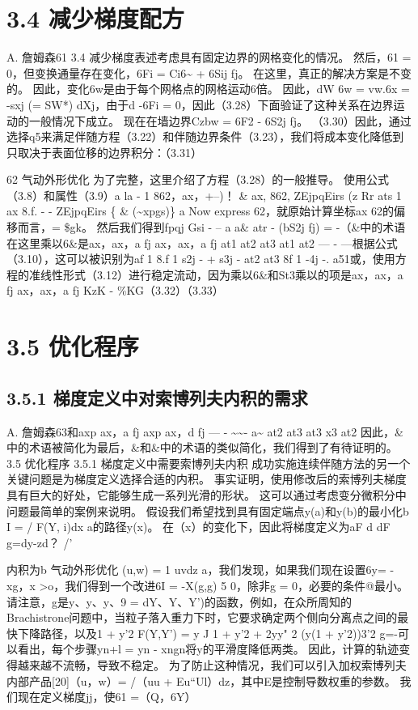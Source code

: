 \documentclass[UTF8,11pt,a4paper,openany,fontset=fandol]{ctexbook}
\begin{document}
\section{3.4 减少梯度配方}
A. 詹姆森61 3.4 减少梯度表述考虑具有固定边界的网格变化的情况。 然后，61 = 0，但变换通量存在变化，6Fi = Ci6\textasciitilde{} + 6Sij fj。 在这里，真正的解决方案是不变的。 因此，变化6w是由于每个网格点的网格运动6倍。 因此，dW 6w = vw.6x = -sxj (= SW*) dXj，由于d -6Fi = 0，因此（3.28）下面验证了这种关系在边界运动的一般情况下成立。 现在在墙边界Czbw = 6F2 - 6S2j fj。 （3.30）因此，通过选择q5来满足伴随方程（3.22）和伴随边界条件（3.23），我们将成本变化降低到只取决于表面位移的边界积分：（3.31）

62 气动外形优化 为了完整，这里介绍了方程（3.28）的一般推导。 使用公式（3.8）和属性（3.9）a la - 1 862，ax，+--)！ \& ax, 862, ZEjpqEirs (z Rr ats 1 ax 8.f. - - ZEjpqEirs \{ \& (\textasciitilde{}xpgs)\} a Now express 62，就原始计算坐标ax 62的偏移而言，= \$gk。 然后我们得到fpqj Gsi - -- a a\& atr - (bS2j fj) = -（\&中的术语在这里乘以6\&是ax，ax，a fj ax，ax，a fj at1 at2 at3 at1 at2 --- - ---根据公式（3.10），这可以被识别为af 1 8.f 1 s2j - + s3j - at2 at3 8f 1 -4j -. a51或，使用方程的准线性形式（3.12）进行稳定流动，因为乘以6\&和St3乘以的项是ax，ax，a fj ax，ax，a fj KzK - \%KG（3.32）（3.33）

\section{3.5 优化程序}
\subsection{3.5.1 梯度定义中对索博列夫内积的需求}
A. 詹姆森63和axp ax，a fj axp ax，d fj --- - \textasciitilde{}\textasciitilde{}- a\textasciitilde{} at2 at3 at3 x3 at2 因此，\&中的术语被简化为最后，\&和\&中的术语的类似简化，我们得到了有待证明的。 3.5 优化程序 3.5.1 梯度定义中需要索博列夫内积 成功实施连续伴随方法的另一个关键问题是为梯度定义选择合适的内积。 事实证明，使用修改后的索博列夫梯度具有巨大的好处，它能够生成一系列光滑的形状。 这可以通过考虑变分微积分中问题最简单的案例来说明。 假设我们希望找到具有固定端点y(a)和y(b)的最小化b I = / F(Y, i)dx a的路径y(x)。 在（x）的变化下，因此将梯度定义为aF d dF g=dy-zd？ /'

内积为b 气动外形优化 (u,w) = 1 uvdz a，我们发现，如果我们现在设置6y= -xg，x >o，我们得到一个改进6I = -X(g,g) 5 0，除非g = 0，必要的条件@最小。 请注意，g是y、y、y、9 = dY、Y、Y')的函数，例如，在众所周知的Brachistrone问题中，当粒子落入重力下时，它要求确定两个侧向分离点之间的最快下降路径，以及1 + y'2 F(Y,Y') = y J 1 + y'2 + 2yy" 2 (y(1 + y'2))3'2 g=-可以看出，每个步骤yn+l = yn - xngn将y的平滑度降低两类。 因此，计算的轨迹变得越来越不流畅，导致不稳定。 为了防止这种情况，我们可以引入加权索博列夫内部产品[20]（u，w）= /（uu + Eu“Ul）dz，其中E是控制导数权重的参数。 我们现在定义梯度jj，使61 =（Q，6Y）
\end{document}
